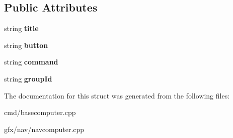 \subsection*{Public Attributes}
\begin{DoxyCompactItemize}
\item 
string {\bfseries title}\hypertarget{structModeInfo_a744942b4514ca78d21b5da779800b1fe}{}\label{structModeInfo_a744942b4514ca78d21b5da779800b1fe}

\item 
string {\bfseries button}\hypertarget{structModeInfo_a0d8cb121e92549f1ab52e251ee4171b0}{}\label{structModeInfo_a0d8cb121e92549f1ab52e251ee4171b0}

\item 
string {\bfseries command}\hypertarget{structModeInfo_ae815bb1d09c764d0db0da704c4dd68e7}{}\label{structModeInfo_ae815bb1d09c764d0db0da704c4dd68e7}

\item 
string {\bfseries group\+Id}\hypertarget{structModeInfo_aea73da04430a2132c0c9120712fcd24c}{}\label{structModeInfo_aea73da04430a2132c0c9120712fcd24c}

\end{DoxyCompactItemize}


The documentation for this struct was generated from the following files\+:\begin{DoxyCompactItemize}
\item 
cmd/basecomputer.\+cpp\item 
gfx/nav/navcomputer.\+cpp\end{DoxyCompactItemize}
